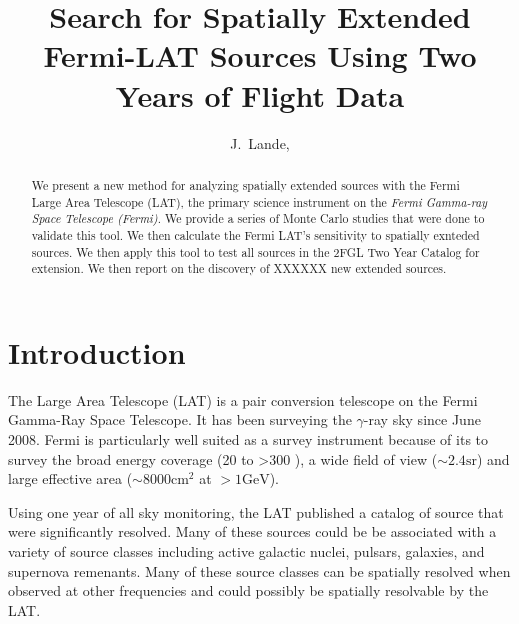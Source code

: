 \documentclass[12pt,preprint]{aastex}
\newcommand{\mev}{\text{MeV}\xspace}
\newcommand{\gev}{\text{GeV}\xspace}
\newcommand{\sr}{\text{sr}\xspace}
\newcommand{\cm}{\text{cm}\xspace}
\begin{document}
\title{Search for Spatially Extended Fermi-LAT Sources Using Two Years of Flight
Data}

\author{
J.~Lande, 
}


\begin{abstract}
We present a new method for analyzing spatially extended sources with
the Fermi Large Area Telescope (LAT), the primary science instrument
on the {\em Fermi Gamma-ray Space Telescope (Fermi)}.  We provide a
series of Monte Carlo studies that were done to validate this tool.
We then calculate the Fermi LAT's sensitivity to spatially exnteded
sources.  We then apply this tool to test all sources in the 2FGL Two
Year Catalog for extension. We then report on the discovery
of XXXXXX new extended sources.
\end{abstract}

\section{Introduction}


The Large Area Telescope (LAT) is a pair conversion telescope on the
Fermi Gamma-Ray Space Telescope. It has been surveying the $\gamma$-ray
sky since June 2008.  Fermi is particularly well suited as a survey
instrument because of its to survey the broad energy coverage (20 \mev
to >300 \gev), a wide field of view ($\sim 2.4 \sr$) and large effective
area ($\sim 8000 \cm^2$ at $>1 \gev$).

Using one year of all sky monitoring, the LAT published a catalog of
source that were significantly resolved.  Many of these sources could
be be associated with a variety of source classes including active
galactic nuclei, pulsars, galaxies, and supernova remenants.  Many of
these source classes can be spatially resolved when observed at other
frequencies and could possibly be spatially resolvable by the LAT.
\end{document}
